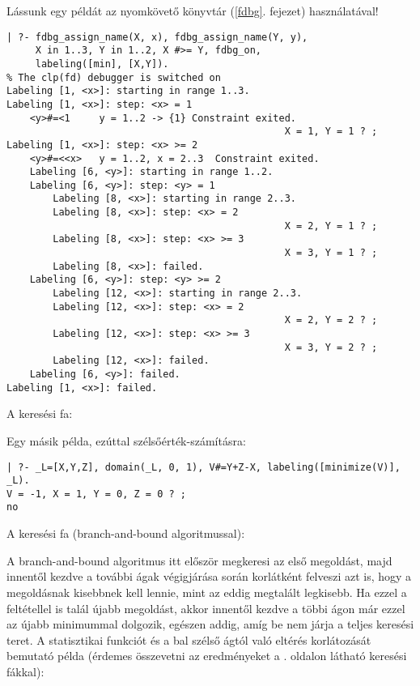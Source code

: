 Lássunk egy példát az \fdbg nyomkövető könyvtár (\ref{fdbg}. fejezet) használatával!
\br
\begin{verbatim}
| ?- fdbg_assign_name(X, x), fdbg_assign_name(Y, y), 
     X in 1..3, Y in 1..2, X #>= Y, fdbg_on, 
     labeling([min], [X,Y]).
% The clp(fd) debugger is switched on
Labeling [1, <x>]: starting in range 1..3.
Labeling [1, <x>]: step: <x> = 1
    <y>#=<1     y = 1..2 -> {1} Constraint exited.
                                                X = 1, Y = 1 ? ;
Labeling [1, <x>]: step: <x> >= 2
    <y>#=<<x>   y = 1..2, x = 2..3  Constraint exited.
    Labeling [6, <y>]: starting in range 1..2.
    Labeling [6, <y>]: step: <y> = 1
        Labeling [8, <x>]: starting in range 2..3.
        Labeling [8, <x>]: step: <x> = 2
                                                X = 2, Y = 1 ? ;
        Labeling [8, <x>]: step: <x> >= 3
                                                X = 3, Y = 1 ? ;
        Labeling [8, <x>]: failed.
    Labeling [6, <y>]: step: <y> >= 2
        Labeling [12, <x>]: starting in range 2..3.
        Labeling [12, <x>]: step: <x> = 2
                                                X = 2, Y = 2 ? ;
        Labeling [12, <x>]: step: <x> >= 3
                                                X = 3, Y = 2 ? ;
        Labeling [12, <x>]: failed.
    Labeling [6, <y>]: failed.
Labeling [1, <x>]: failed.
\end{verbatim}

A keresési fa:

\begin{center}
\end{center}

Egy másik példa, ezúttal szélsőérték-számításra:

\begin{verbatim}
| ?- _L=[X,Y,Z], domain(_L, 0, 1), V#=Y+Z-X, labeling([minimize(V)], _L).
V = -1, X = 1, Y = 0, Z = 0 ? ;
no
\end{verbatim}

A keresési fa (branch-and-bound algoritmussal):

\begin{center}
\end{center}

A branch-and-bound algoritmus itt először megkeresi az első megoldást, majd innentől
kezdve a további ágak végigjárása során korlátként felveszi azt is, hogy a megoldásnak
kisebbnek kell lennie, mint az eddig megtalált legkisebb. Ha ezzel a feltétellel is
talál újabb megoldást, akkor innentől kezdve a többi ágon már ezzel az újabb minimummal
dolgozik, egészen addig, amíg be nem járja a teljes keresési teret.
\br
A statisztikai funkciót  és a bal szélső ágtól való eltérés korlátozását bemutató példa
(érdemes összevetni az eredményeket a \pageref{kerfak}. oldalon látható keresési
fákkal):

